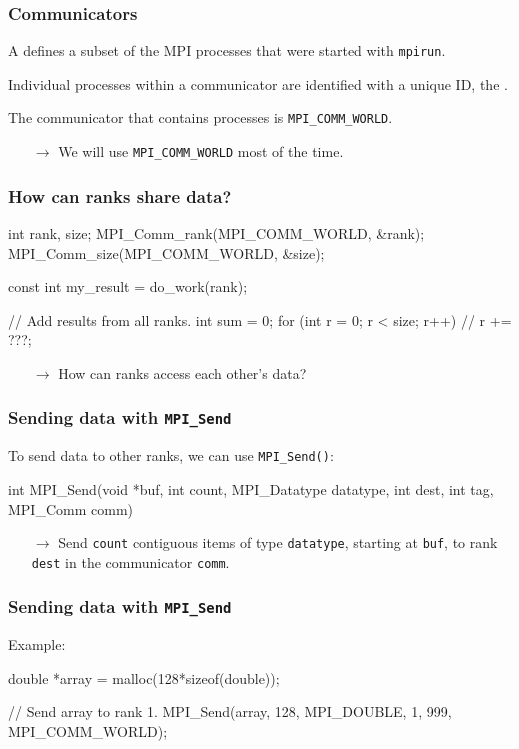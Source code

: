 \documentclass[12pt,t]{beamer}
\let\emph\relax %
\newcommand{\conclude}[1]{%
  \begin{itemize}
    \item[$\rightarrow$]#1
  \end{itemize}
}
\begin{document}
  \begin{frame}[fragile]
    \frametitle{Communicators}

    A \emph{communicator} defines a subset of the MPI processes that were started with \texttt{mpirun}.

    Individual processes within a communicator are identified with a unique ID, the \emph{rank}.

    The communicator that contains \emph{all} processes is \texttt{MPI\_COMM\_WORLD}.
    \conclude{We will use \texttt{MPI\_COMM\_WORLD} most of the time.}
  \end{frame}

  \begin{frame}[fragile]
    \frametitle{How can ranks share data?}

    \begin{code}
int rank, size;
MPI_Comm_rank(MPI_COMM_WORLD, &rank);
MPI_Comm_size(MPI_COMM_WORLD, &size);

const int my_result = do_work(rank);

// Add results from all ranks.
int sum = 0;
for (int r = 0; r < size; r++) {
  // r += ???;
}

    \end{code}
    \conclude{How can ranks access each other's data?}
  \end{frame}

  \begin{frame}[fragile]
    \frametitle{Sending data with \texttt{MPI\_Send}}

    To send data to other ranks, we can use \texttt{MPI\_Send()}:
    \begin{code}
int MPI_Send(void *buf,
             int count,
             MPI_Datatype datatype,
             int dest,
             int tag,
             MPI_Comm comm)
    \end{code}
    \conclude{Send \texttt{count} contiguous items of type \texttt{datatype}, starting at \texttt{buf}, to rank \texttt{dest} in the communicator \texttt{comm}.}
  \end{frame}

  \begin{frame}[fragile]
    \frametitle{Sending data with \texttt{MPI\_Send}}

    Example:
    \begin{code}
double *array = malloc(128*sizeof(double));

// Send array to rank 1.
MPI_Send(array,
         128,
         MPI_DOUBLE,
         1,
         999,
         MPI_COMM_WORLD);
    \end{code}
  \end{frame}
\end{document}
